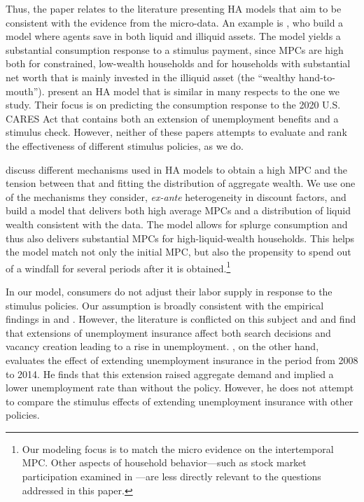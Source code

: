 \documentclass[\econtexRoot/HAFiscal]{subfiles}
\begin{document}
Thus, the paper relates to the literature presenting HA models that aim to be consistent with the evidence from the micro-data. An example is \cite{kaplan2014model}, who build a model where agents save in both liquid and illiquid assets. The model yields a substantial consumption response to a stimulus payment, since MPCs are high both for constrained, low-wealth households and for households with substantial net worth that is mainly invested in the illiquid asset (the ``wealthy hand-to-mouth''). \cite{carroll2020modeling} present an HA model that is similar in many respects to the one we study. Their focus is on predicting the consumption response to the 2020 U.S. CARES Act that contains both an extension of unemployment benefits and a stimulus check. However, neither of these papers attempts to evaluate and rank the effectiveness of different stimulus policies, as we do.

\cite{kaplanMPC2022} discuss different mechanisms used in HA models to obtain a high MPC and the tension between that and fitting the distribution of aggregate wealth. We use one of the mechanisms they consider, \textit{ex-ante} heterogeneity in discount factors, and build a model that delivers both high average MPCs and a distribution of liquid wealth consistent with the data. The model allows for splurge consumption and thus also delivers substantial MPCs for high-liquid-wealth households. This helps the model match not only the initial MPC, but also the propensity to spend out of a windfall for several periods after it is obtained.\footnote{Our modeling focus is to match the micro evidence on the intertemporal MPC. Other aspects of household behavior---such as stock market participation examined in \cite{melcangiStock}---are less directly relevant to the questions addressed in this paper.}

In our model, consumers do not adjust their labor supply in response to the stimulus policies.  Our assumption is broadly consistent with the empirical findings in \cite{ganong2022spending} and \cite{chodorow2016limited}. However, the literature is conflicted on this subject and \cite{hagedorn2017impact} and \cite{hagedorn2019unemployment} find that extensions of unemployment insurance affect both search decisions and vacancy creation leading to a rise in unemployment. \cite{kekre2022unemp}, on the other hand, evaluates the effect of extending unemployment insurance in the period from 2008 to 2014. He finds that this extension raised aggregate demand and implied a lower unemployment rate than without the policy. However, he does not attempt to compare the stimulus effects of extending unemployment insurance with other policies.
\end{document}
